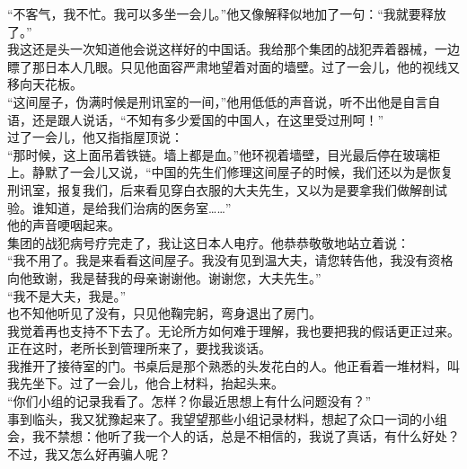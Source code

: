 “不客气，我不忙。我可以多坐一会儿。”他又像解释似地加了一句：“我就要释放了。”\\

我这还是头一次知道他会说这样好的中国话。我给那个集团的战犯弄着器械，一边瞟了那日本人几眼。只见他面容严肃地望着对面的墙壁。过了一会儿，他的视线又移向天花板。\\

“这间屋子，伪满时候是刑讯室的一间，”他用低低的声音说，听不出他是自言自语，还是跟人说话，“不知有多少爱国的中国人，在这里受过刑呵！”\\

过了一会儿，他又指指屋顶说：\\

“那时候，这上面吊着铁链。墙上都是血。”他环视着墙壁，目光最后停在玻璃柜上。静默了一会儿又说，“中国的先生们修理这间屋子的时候，我们还以为是恢复刑讯室，报复我们，后来看见穿白衣服的大夫先生，又以为是要拿我们做解剖试验。谁知道，是给我们治病的医务室……”\\

他的声音哽咽起来。\\

集团的战犯病号疗完走了，我让这日本人电疗。他恭恭敬敬地站立着说：\\

“我不用了。我是来看看这间屋子。我没有见到温大夫，请您转告他，我没有资格向他致谢，我是替我的母亲谢谢他。谢谢您，大夫先生。”\\

“我不是大夫，我是。”\\

也不知他听见了没有，只见他鞠完躬，弯身退出了房门。\\

我觉着再也支持不下去了。无论所方如何难于理解，我也要把我的假话更正过来。\\

正在这时，老所长到管理所来了，要找我谈话。\\

我推开了接待室的门。书桌后是那个熟悉的头发花白的人。他正看着一堆材料，叫我先坐下。过了一会儿，他合上材料，抬起头来。\\

“你们小组的记录我看了。怎样？你最近思想上有什么问题没有？”\\

事到临头，我又犹豫起来了。我望望那些小组记录材料，想起了众口一词的小组会，我不禁想：他听了我一个人的话，总是不相信的，我说了真话，有什么好处？不过，我又怎么好再骗人呢？\\

